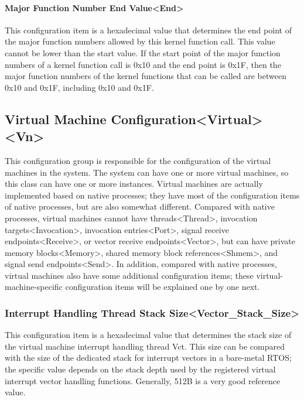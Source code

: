 \paragraph{Major Function Number End Value<End>{}}\label{par:5-3-14-22-3}

This configuration item is a hexadecimal value that determines the end point of the major function numbers allowed by this kernel function call. This value cannot be lower than the start value. If the start point of the major function numbers of a kernel function call is 0x10 and the end point is 0x1F, then the major function numbers of the kernel functions that can be called are between 0x10 and 0x1F, including 0x10 and 0x1F.

\subsection{Virtual Machine Configuration<Virtual><Vn>{}}\label{subsec:5-3-15}

This configuration group is responsible for the configuration of the virtual machines in the system. The system can have one or more virtual machines, so this class can have one or more instances. Virtual machines are actually implemented based on native processes; they have most of the configuration items of native processes, but are also somewhat different. Compared with native processes, virtual machines cannot have threads<Thread>, invocation targets<Invocation>, invocation entries<Port>, signal receive endpoints<Receive>, or vector receive endpoints<Vector>, but can have private memory blocks<Memory>, shared memory block references<Shmem>, and signal send endpoints<Send>. In addition, compared with native processes, virtual machines also have some additional configuration items; these virtual-machine-specific configuration items will be explained one by one next.

\subsubsection{Interrupt Handling Thread Stack Size<Vector\_Stack\_Size>{}}\label{subsubsec:5-3-15-1}

This configuration item is a hexadecimal value that determines the stack size of the virtual machine interrupt handling thread Vct. This size can be compared with the size of the dedicated stack for interrupt vectors in a bare-metal RTOS; the specific value depends on the stack depth used by the registered virtual interrupt vector handling functions. Generally, 512B is a very good reference value.

